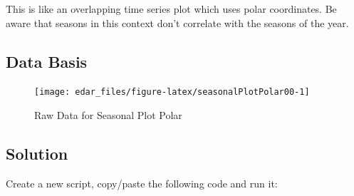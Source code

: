 \documentclass[
  a4paperpaper,
]{book}
\begin{document}
This is like an overlapping time series plot which uses polar coordinates. Be aware that seasons in this context don't correlate with the seasons of the year.

\hypertarget{data-basis-2}{%
\subsection{Data Basis}\label{data-basis-2}}

\begin{figure}
\texttt{[image: edar\_files/figure-latex/seasonalPlotPolar00-1]} \caption{Raw Data for Seasonal Plot Polar}\label{fig:seasonalPlotPolar00}
\end{figure}

\newpage

\hypertarget{solution-2}{%
\subsection{Solution}\label{solution-2}}

Create a new script, copy/paste the following code and run it:
\end{document}
